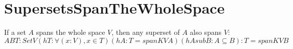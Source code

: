 \section{SupersetsSpanTheWholeSpace}

\begin{theorem}
  \label{theorem : superset_span_full}
  \leanok
  If a set $A$ spans the whole space $V$, then any superset of $A$ also spans $V$: ${A B T: Set V} (hT: ∀ (x : V), x \in T)(hA : T = span K V A) (hAsubB : A \subseteq B) :
    T = span K V B$
\end{theorem}
